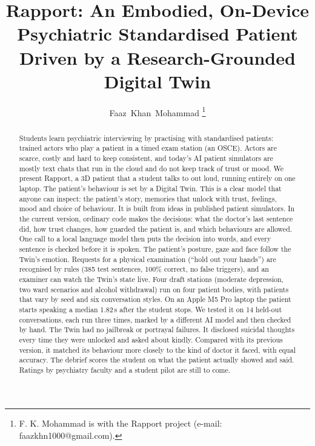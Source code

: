 \documentclass[journal]{IEEEtran}
\begin{document}
\title{Rapport: An Embodied, On-Device Psychiatric Standardised Patient Driven by a Research-Grounded Digital Twin}

\author{Faaz~Khan~Mohammad%
\thanks{F. K. Mohammad is with the Rapport project (e-mail: faazkhn1000@gmail.com).}}

\maketitle

\begin{abstract}
Students learn psychiatric interviewing by practising with standardised patients: trained actors who play a patient in a timed exam station
(an OSCE). Actors are scarce, costly and hard to keep consistent, and today's AI patient simulators are mostly text chats that run in the cloud
and do not keep track of trust or mood. We present Rapport, a 3D patient that a student talks to out loud, running entirely on one laptop. The patient's behaviour is set by a Digital Twin. This is a clear model that anyone can inspect: the patient's story, memories that unlock with trust, feelings, mood and choice of behaviour. It is built from ideas in published patient simulators. In the current version, ordinary code makes the decisions: what the doctor's last sentence did, how trust changes, how guarded the patient is, and which behaviours are allowed. One call to a local language model then puts the decision into words, and every sentence is checked before it is spoken. The patient's posture, gaze and face follow the Twin's emotion.
Requests for a physical examination (``hold out your hands'') are recognised by rules (385 test sentences, 100\% correct, no false triggers), and
an examiner can watch the Twin's state live. Four draft stations (moderate depression, two ward scenarios and alcohol withdrawal) run on four patient
bodies, with patients that vary by seed and six conversation styles. On an Apple M5 Pro laptop the patient starts speaking a median 1.82\,s after the
student stops. We tested it on 14 held-out conversations, each run three times, marked by a different AI model and then checked by hand. The Twin had no jailbreak or portrayal failures. It disclosed suicidal thoughts every time they were unlocked and asked about kindly. Compared with its previous version, it matched its behaviour more closely to the kind of doctor it faced, with equal accuracy. The debrief scores the student on what the patient actually showed and said. Ratings by psychiatry faculty
and a student pilot are still to come.
\end{abstract}
\end{document}
